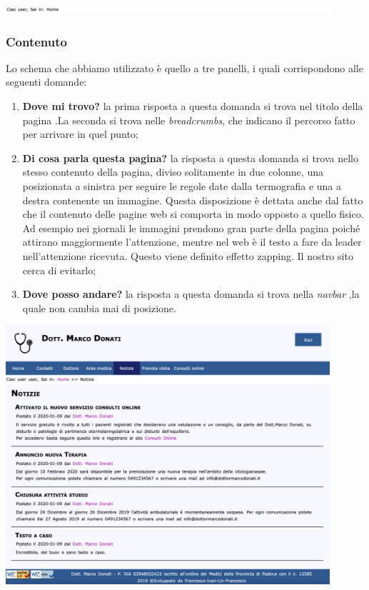 \begin{center}
\includegraphics[width=12cm]{../img/bread2}
\end{center}

\subsubsection{Contenuto}
Lo schema che abbiamo utilizzato è quello a tre panelli, i quali corrispondono alle seguenti domande:
\begin{enumerate}
\item \textbf{Dove mi trovo?} la prima risposta a questa domanda si trova nel titolo della pagina .La seconda si trova nelle \textit{breadcrumbs}, che indicano il percorso fatto per arrivare in quel punto;
\item \textbf{Di cosa parla questa pagina?} la risposta a questa domanda si trova nello stesso contenuto della pagina, diviso solitamente in due colonne, una posizionata a sinistra per seguire le regole date dalla termografia e una a destra contenente un immagine. Questa disposizione è dettata anche dal fatto che il contenuto delle pagine web si comporta in modo opposto a quello fisico. Ad esempio nei giornali le immagini prendono gran parte della pagina poiché attirano maggiormente l'attenzione, mentre nel web è il testo a fare da leader nell’attenzione ricevuta. Questo viene definito effetto zapping. Il nostro sito cerca di evitarlo;
\item \textbf{Dove posso andare?} la risposta a questa domanda si trova nella \textit{navbar} ,la quale non cambia mai di posizione. \\
\end{enumerate}

\begin{center}
\includegraphics[width=12cm]{../img/contenuto}
\end{center}

